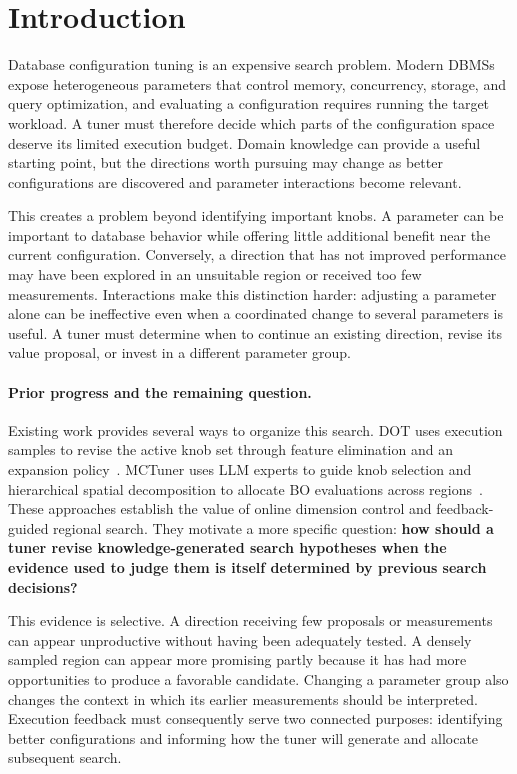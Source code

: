 \section{Introduction}

Database configuration tuning is an expensive search problem. Modern DBMSs expose heterogeneous parameters that control memory, concurrency, storage, and query optimization, and evaluating a configuration requires running the target workload. A tuner must therefore decide which parts of the configuration space deserve its limited execution budget. Domain knowledge can provide a useful starting point, but the directions worth pursuing may change as better configurations are discovered and parameter interactions become relevant.

This creates a problem beyond identifying important knobs. A parameter can be important to database behavior while offering little additional benefit near the current configuration. Conversely, a direction that has not improved performance may have been explored in an unsuitable region or received too few measurements. Interactions make this distinction harder: adjusting a parameter alone can be ineffective even when a coordinated change to several parameters is useful. A tuner must determine when to continue an existing direction, revise its value proposal, or invest in a different parameter group.

\paragraph{Prior progress and the remaining question.}
Existing work provides several ways to organize this search. DOT uses execution samples to revise the active knob set through feature elimination and an expansion policy~\cite{dot}. MCTuner uses LLM experts to guide knob selection and hierarchical spatial decomposition to allocate BO evaluations across regions~\cite{mctuner}. These approaches establish the value of online dimension control and feedback-guided regional search. They motivate a more specific question: \textbf{how should a tuner revise knowledge-generated search hypotheses when the evidence used to judge them is itself determined by previous search decisions?}

This evidence is selective. A direction receiving few proposals or measurements can appear unproductive without having been adequately tested. A densely sampled region can appear more promising partly because it has had more opportunities to produce a favorable candidate. Changing a parameter group also changes the context in which its earlier measurements should be interpreted. Execution feedback must consequently serve two connected purposes: identifying better configurations and informing how the tuner will generate and allocate subsequent search.

